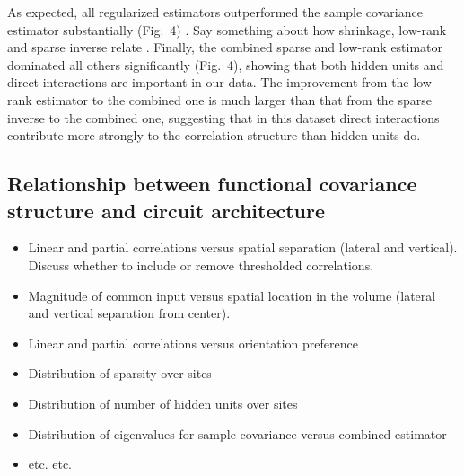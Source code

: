 As expected, all regularized estimators outperformed the sample covariance estimator substantially (Fig.~4) . Say something about how shrinkage, low-rank and sparse inverse relate . Finally, the combined sparse and low-rank estimator dominated all others significantly (Fig.~4), showing that both hidden units and direct interactions are important in our data. The improvement from the low-rank estimator to the combined one is much larger than that from the sparse inverse to the combined one, suggesting that in this dataset direct interactions contribute more strongly to the correlation structure than hidden units do.



\subsection*{Relationship between functional covariance structure and circuit architecture}


\begin{itemize}
\item Linear and partial correlations versus spatial separation (lateral and vertical). Discuss whether to include or remove thresholded correlations.
\item Magnitude of common input versus spatial location in the volume (lateral and vertical separation from center).
\item Linear and partial correlations versus orientation preference
\item Distribution of sparsity over sites
\item Distribution of number of hidden units over sites
\item Distribution of eigenvalues for sample covariance versus combined estimator
\item etc. etc. 

\end{itemize}





